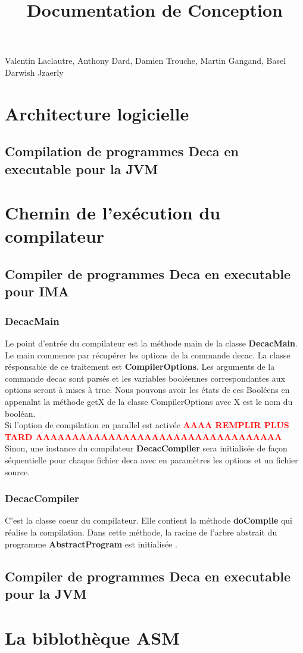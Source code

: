 \documentclass[12pt, a4paper, one side]{article}
\title{Documentation de Conception}
\author{}
\date{}
\begin{document}
    \maketitle

    \begin{center}
        Valentin Laclautre, Anthony Dard, Damien Trouche, Martin Gangand, Basel Darwish Jzaerly
    \end{center}

    \tableofcontents
    \section{Architecture logicielle}
    \subsection{Compilation de programmes Deca en executable pour la JVM}
    \section{Chemin de l'exécution du compilateur}
    \subsection{Compiler de programmes Deca en executable pour IMA}

    \subsubsection{DecacMain}
    Le point d'entrée du compilateur est la méthode main de la classe \textbf {DecacMain}. Le main commence par récupérer les options de la commande decac. La classe résponsable de ce traitement est \textbf{CompilerOptions}. Les arguments de la commande decac sont parsés et les variables booléennes correspondantes aux options seront à mises à true. Nous pouvons avoir les états de ces Booléens en appenalnt la méthode getX de la classe CompilerOptions avec X est le nom du booléan.
    \\
    Si l'option de compilation en parallel est activée \textbf {\textcolor{red}{AAAA REMPLIR PLUS TARD AAAAAAAAAAAAAAAAAAAAAAAAAAAAAAAAAA}} \\
    Sinon, une instance du compilateur \textbf{DecacCompiler} sera initialisée de façon séquentielle pour chaque fichier deca avec en paramètres les options et un fichier source.

    \subsubsection{DecacCompiler} C'est la classe coeur du compilateur. Elle contient la méthode \textbf{doCompile} qui réalise la compilation. Dans cette méthode, la racine de l'arbre abstrait du programme \textbf{AbstractProgram} est initialisée .

    \subsection{Compiler de programmes Deca en executable pour la JVM}
    \section{La biblothèque ASM}
\end{document}
